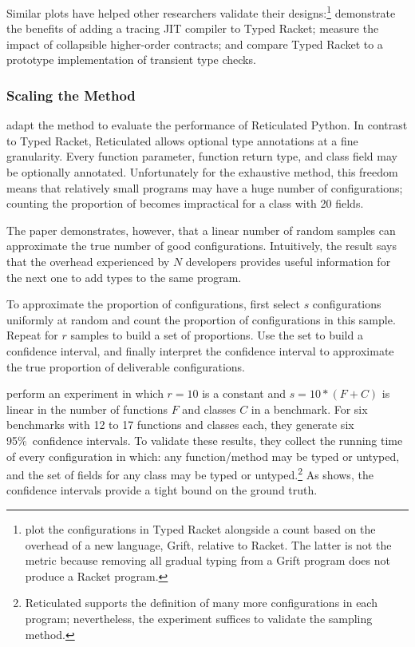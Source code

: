 Similar plots have helped other researchers validate their designs:\footnote{\citet{kas-pldi-2019} plot the
  configurations in Typed Racket alongside a count based on
 the overhead of a new language, Grift, relative to Racket.
 The latter is not the  metric because removing all gradual typing from
 a Grift program does not produce a Racket program.}
\citet{bbst-oopsla-2017} demonstrate the benefits of adding a tracing JIT compiler to Typed Racket;
\citet{fgsfs-oopsla-2018} measure the impact of collapsible higher-order contracts; and
\citet{gf-icfp-2018} compare Typed Racket to a prototype implementation of transient type checks.


\subsubsection{Scaling the Method}

\citet{gm-pepm-2018} adapt the method to evaluate the performance of Reticulated
 Python.
In contrast to Typed Racket, Reticulated allows optional type annotations at
 a fine granularity.
Every function parameter, function return type, and class field may
 be optionally annotated.
Unfortunately for the exhaustive method, this freedom means that relatively
 small programs may have a huge number of configurations;
 counting the proportion of  becomes impractical for a class with 20 fields.

The paper demonstrates, however, that a linear number of random samples can
 approximate the true number of good configurations.
Intuitively, the result says that the overhead experienced by $N$ developers
 provides useful information for the next one to add types to the same program.

To approximate the proportion of  configurations,
 first select $s$ configurations uniformly at random and count the
 proportion of  configurations in this sample.
Repeat for $r$ samples to build a set of proportions.
Use the set to build a confidence interval, and finally interpret the
 confidence interval to approximate the true proportion of deliverable configurations.

\citet{gm-pepm-2018} perform an experiment in which $r=10$ is a constant
 and $s = 10 * (F + C)$ is linear in the number of functions $F$ and classes
 $C$ in a benchmark.
For six benchmarks with 12 to 17 functions and classes each,
 they generate six 95\%~confidence intervals.
To validate these results, they collect the running time of every configuration
 in which: any function/method may be typed or untyped, and the set of fields
 for any class may be typed or untyped.\footnote{Reticulated supports the definition
  of many more configurations in each program; nevertheless, the experiment suffices to
  validate the sampling method.}
As  shows, the confidence intervals provide a tight
 bound on the ground truth.

